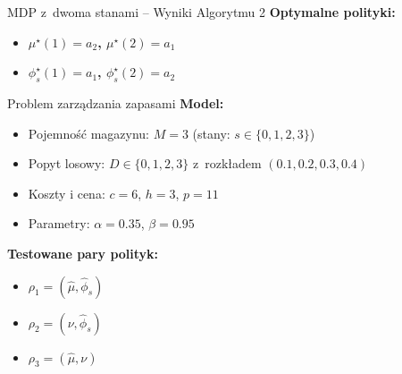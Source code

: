 \documentclass[aspectratio=169]{beamer}
\begin{document}
\begin{frame}{MDP z~dwoma stanami -- Wyniki Algorytmu 2}
\vspace{0.3em}
\textbf{Optymalne polityki:}
\begin{itemize}
    \item \textbf{$\mu^\star(1)=a_2$, $\mu^\star(2)=a_1$}
    \item \textbf{$\phi_s^\star(1)=a_1$, $\phi_s^\star(2)=a_2$}
\end{itemize}
\end{frame}

\begin{frame}{Problem zarządzania zapasami}
\textbf{Model:}
\begin{itemize}
    \item Pojemność magazynu: $M = 3$ (stany: $s\in\{0,1,2,3\}$)
    \item Popyt losowy: $D \in \{0,1,2,3\}$ z~rozkładem $(0.1, 0.2, 0.3, 0.4)$
    \item Koszty i cena: $c=6$, $h=3$, $p=11$
    \item Parametry: $\alpha = 0.35$, $\beta = 0.95$
\end{itemize}

\vspace{0.5em}
\textbf{Testowane pary polityk:}
\begin{itemize}
    \item $\rho_1=(\hat{\mu},\hat{\phi}_s)$
    \item $\rho_2=(\nu,\hat{\phi}_s)$
    \item $\rho_3=(\hat{\mu},\nu)$
\end{itemize}
\end{frame}
\end{document}
